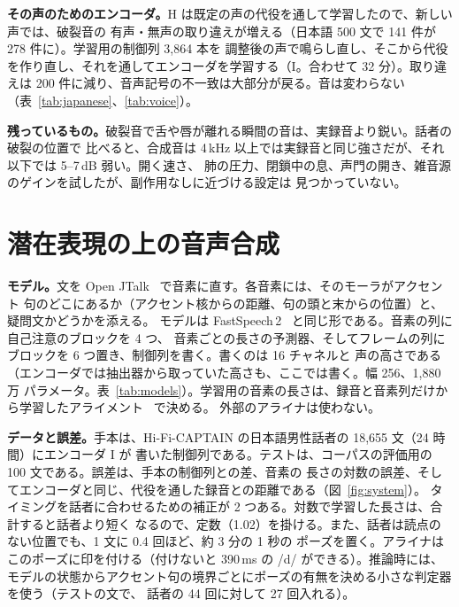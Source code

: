 \documentclass[10pt,a4paper,twocolumn]{article}
\begin{document}
\textbf{その声のためのエンコーダ。}H は既定の声の代役を通して学習したので、新しい声では、破裂音の
有声・無声の取り違えが増える（日本語 500 文で 141 件が 278 件に）。学習用の制御列 3,864 本を
調整後の声で鳴らし直し、そこから代役を作り直し、それを通してエンコーダを学習する（I。合わせて
32 分）。取り違えは 200 件に減り、音声記号の不一致は大部分が戻る。音は変わらない
（表~\ref{tab:japanese}、\ref{tab:voice}）。

\textbf{残っているもの。}破裂音で舌や唇が離れる瞬間の音は、実録音より鋭い。話者の破裂の位置で
比べると、合成音は 4\,kHz 以上では実録音と同じ強さだが、それ以下では 5--7\,dB 弱い。開く速さ、
肺の圧力、閉鎖中の息、声門の開き、雑音源のゲインを試したが、副作用なしに近づける設定は
見つかっていない。

\section{潜在表現の上の音声合成}\label{sec:tts}
\textbf{モデル。}文を Open JTalk~\cite{openjtalk} で音素に直す。各音素には、そのモーラがアクセント
句のどこにあるか（アクセント核からの距離、句の頭と末からの位置）と、疑問文かどうかを添える。
モデルは FastSpeech\,2~\cite{fastspeech2} と同じ形である。音素の列に自己注意のブロックを 4 つ、
音素ごとの長さの予測器、そしてフレームの列にブロックを 6 つ置き、制御列を書く。書くのは 16 チャネルと
声の高さである（エンコーダでは抽出器から取っていた高さも、ここでは書く。幅 256、1,880 万
パラメータ。表~\ref{tab:models}）。学習用の音素の長さは、録音と音素列だけから学習したアライメント~\cite{ota} で決める。
外部のアライナは使わない。

\textbf{データと誤差。}手本は、Hi-Fi-CAPTAIN の日本語男性話者の 18,655 文（24 時間）にエンコーダ I が
書いた制御列である。テストは、コーパスの評価用の 100 文である。誤差は、手本の制御列との差、音素の
長さの対数の誤差、そしてエンコーダと同じ、代役を通した録音との距離である（図~\ref{fig:system}）。
タイミングを話者に合わせるための補正が 2 つある。対数で学習した長さは、合計すると話者より短く
なるので、定数（1.02）を掛ける。また、話者は読点のない位置でも、1 文に 0.4 回ほど、約 3 分の 1 秒の
ポーズを置く。アライナはこのポーズに印を付ける（付けないと 390\,ms の /d/ ができる）。推論時には、
モデルの状態からアクセント句の境界ごとにポーズの有無を決める小さな判定器を使う（テストの文で、
話者の 44 回に対して 27 回入れる）。
\end{document}
